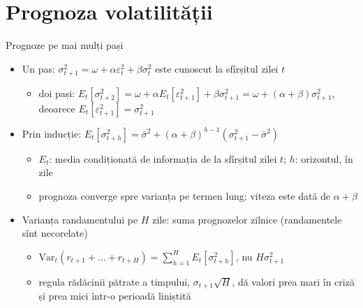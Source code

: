 \section{Prognoza volatilității}

\begin{frame}{Prognoze pe mai mulți pași}
\itemsize{\small}
\begin{itemize}
    \item Un pas: $\sigma_{t+1}^2 = \omega + \alpha\varepsilon_t^2 + \beta\sigma_t^2$ este cunoscut la sfîrșitul zilei $t$
    \begin{itemize}
        \item doi pași: $E_t[\sigma_{t+2}^2] = \omega + \alpha E_t[\varepsilon_{t+1}^2] + \beta\sigma_{t+1}^2 = \omega + (\alpha + \beta)\sigma_{t+1}^2$, deoarece $E_t[\varepsilon_{t+1}^2] = \sigma_{t+1}^2$
    \end{itemize}
    \item Prin inducție: $E_t[\sigma_{t+h}^2] = \bar\sigma^2 + (\alpha + \beta)^{h-1}(\sigma_{t+1}^2 - \bar\sigma^2)$
    \begin{itemize}
        \item $E_t$: media condiționată de informația de la sfîrșitul zilei $t$; $h$: orizontul, în zile
        \item prognoza converge spre varianța pe termen lung; viteza este dată de $\alpha + \beta$
    \end{itemize}
    \item Varianța randamentului pe $H$ zile: suma prognozelor zilnice (randamentele sînt necorelate)
    \begin{itemize}
        \item $\mathrm{Var}_t(r_{t+1} + \dots + r_{t+H}) = \sum_{h=1}^{H} E_t[\sigma_{t+h}^2]$, nu $H\sigma_{t+1}^2$
        \item regula rădăcinii pătrate a timpului, $\sigma_{t+1}\sqrt{H}$, dă valori prea mari în criză și prea mici într-o perioadă liniștită
    \end{itemize}
\end{itemize}
\end{frame}

